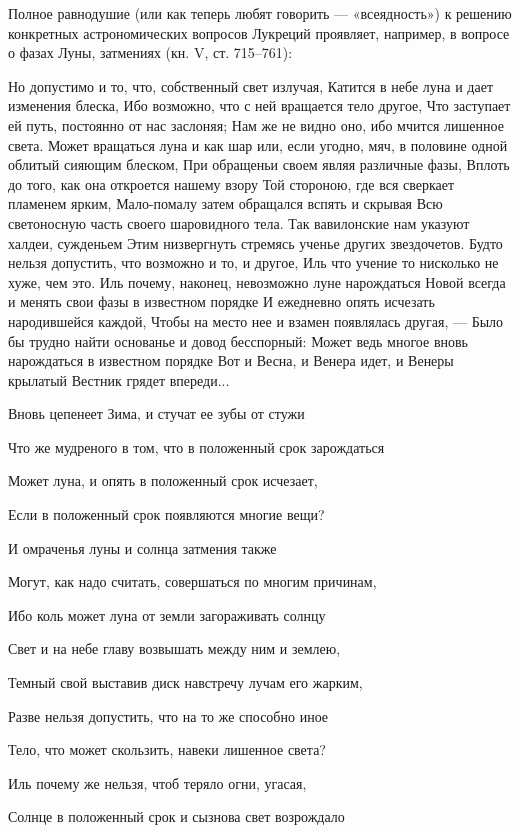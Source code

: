Полное  равнодушие (или  как теперь  любят говорить  --- «всеядность»)
к  решению  конкретных  астрономических вопросов  Лукреций  проявляет,
например, в вопросе о фазах Луны, затмениях (кн. V, ст. 715--761):

Но допустимо и то, что, собственный  свет излучая, Катится в небе луна
и  дает изменения  блеска,  Ибо  возможно, что  с  ней вращается  тело
другое, Что  заступает ей путь, постоянно  от нас заслоняя; Нам  же не
видно оно, ибо  мчится лишенное света. Может вращаться луна  и как шар
или, если угодно,  мяч, в половине одной облитый  сияющим блеском, При
обращеньи  своем  являя  различные  фазы,  Вплоть  до  того,  как  она
откроется нашему взору Той стороною,  где вся сверкает пламенем ярким,
Мало-помалу  затем обращался  вспять и  скрывая Всю  светоносную часть
своего шаровидного тела. Так вавилонские нам указуют халдеи, сужденьем
Этим  низвергнуть стремясь  ученье  других  звездочетов. Будто  нельзя
допустить, что возможно и то, и другое, Иль что учение то нисколько не
хуже, чем это. Иль почему,  наконец, невозможно луне нарождаться Новой
всегда  и менять  свои  фазы  в известном  порядке  И ежедневно  опять
исчезать народившейся каждой,  Чтобы на место нее  и взамен появлялась
другая, --- Было  бы трудно найти основанье и  довод бесспорный: Может
ведь  многое вновь  нарождаться в  известном  порядке Вот  и Весна,  и
Венера идет, и Венеры крылатый Вестник грядет впереди...

Вновь цепенеет Зима, и стучат ее зубы от стужи

Что же мудреного в том, что в положенный срок зарождаться

Может луна, и опять в положенный срок исчезает,

Если в положенный срок появляются многие вещи?

И омраченья луны и солнца затмения также

Могут, как надо считать, совершаться по многим причинам,

Ибо коль может луна от земли загораживать солнцу

Свет и на небе главу возвышать между ним и землею,

Темный свой выставив диск навстречу лучам его жарким,

Разве нельзя допустить, что на то же способно иное

Тело, что может скользить, навеки лишенное света?

Иль почему же нельзя, чтоб теряло огни, угасая,

Солнце в положенный срок и сызнова свет возрождало

